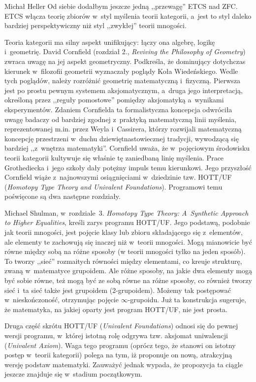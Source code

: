 \begin{recplenv}{Michał Heller}
Od siebie dodałbym jeszcze jedną ,,przewagę'' ETCS nad ZFC. ETCS włącza teorię zbiorów w~styl myślenia teorii kategorii, a~jest to styl daleko bardziej perspektywiczny niż styl ,,zwykłej'' teorii mnogości.

Teoria kategorii ma silny aspekt unifikujący: łączy ona algebrę, logikę i~geometrię. David Cornfield (rozdział 2., \textit{Reviving the Philosophy of Geometry}) zwraca uwagę na jej aspekt geometryczny. Podkreśla, że dominujący dotychczas kierunek w~filozofii geometrii wyznaczały poglądy Koła Wiedeńskiego. Wedle tych poglądów, należy rozróżnić geometrię matematyczną i~fizyczną. Pierwsza jest po prostu pewnym systemem aksjomatycznym, a~druga jego interpretacją, określoną przez ,,reguły pomostowe'' pomiędzy aksjomatyką a~wynikami eksperymentów. Zdaniem Cornfielda ta formalistyczna koncepcja odwróciła uwagę badaczy od bardziej zgodnej z~praktyką matematyczną linii myślenia, reprezentowanej m.in. przez Weyla i~Cassirera, którzy rozwijali matematyczną koncepcję przestrzeni w~duchu dziewiętnastowiecznej tradycji, wywodzącą się bardziej ,,z~wnętrza matematyki''. Cornfield uważa, że w~pojęciowym środowisku teorii kategorii kultywuje się właśnie tę zaniedbaną linię myślenia. Prace Grothediecka i~jego szkoły dały potężny impuls temu kierunkowi. Jego przyszłość Cornfield wiąże z~najnowszymi osiągnięciami w~dziedzinie tzw. HOTT/UF (\textit{Homotopy Type Theory and Univalent Foundations}). Programowi temu poświęcone są dwa następne rozdziały.

Michael Shulman, w~rozdziale~3. \textit{Homotopy Type Theory: A~Synthetic Approach to Higher Equalities}, kreśli zarys programu \mbox{HOTT/UF}. Jego podstawą, podobnie jak teorii mnogości, jest pojęcie klasy lub zbioru składającego się z~elementów, ale elementy te zachowują się inaczej niż w~teorii mnogości. Mogą mianowicie być równe między sobą na różne sposoby (w teorii mnogości tylko na jeden sposób). To tworzy ,,sieć'' rozmaitych równości między elementami, co kreuje strukturę, zwaną w~matematyce grupoidem. Ale różne sposoby, na jakie dwa elementy mogą być sobie równe, też mogą być ze sobą równe na różne sposoby, co również tworzy sieć i~ta sieć także jest grupoidem (2-grupoidem). Możemy tak postępować w~nieskończoność, otrzymując pojęcie \mbox{$\infty$-grupoidu}. Już ta konstrukcja sugeruje, że matematyka, na jakiej oparty jest program HOTT/UF, nie jest prosta.

Druga część skrótu HOTT/UF (\textit{Univalent Foundations}) odnosi się do pewnej wersji programu, w~której istotną rolę odgrywa tzw. aksjomat uniwalencji (\textit{Univalent Axiom}). Waga tego programu (oprócz tego, że stanowi on istotny postęp w~teorii kategorii) polega na tym, iż proponuje on nową, atrakcyjną wersję podstaw matematyki. Zauważyć jednak wypada, że propozycja ta ciągle jeszcze znajduje się w~stadium początkowym.


\end{recplenv}
